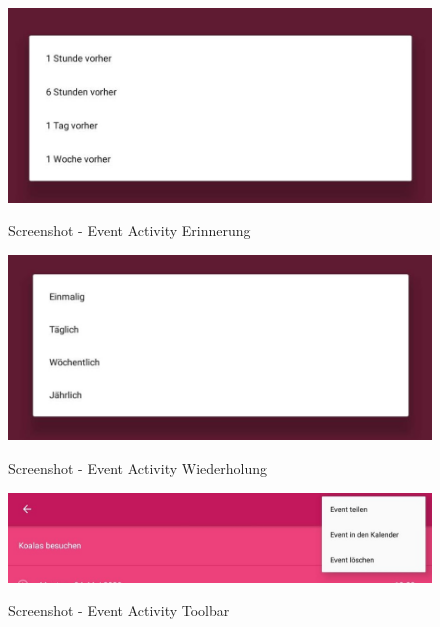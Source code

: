 \begin{figure}[H]
\centering
\begin{minipage}[t]{1\textwidth} %
\caption{Screenshot - Event Activity Erinnerung} %
\includegraphics[width=13 cm]{img/Screenshot_EventActivityReminder.jpg}\\ %
\end{minipage}
\end{figure}

\begin{figure}[H]
\centering
\begin{minipage}[t]{1\textwidth} %
\caption{Screenshot - Event Activity Wiederholung} %
\includegraphics[width=13 cm]{img/Screenshot_EventActivityRecurringType.jpg}\\ %
\end{minipage}
\end{figure}

\begin{figure}[H]
\centering
\begin{minipage}[t]{1\textwidth} %
\caption{Screenshot - Event Activity Toolbar} %
\includegraphics[width=13 cm]{img/Screenshot_EventActivityToolbar.jpg}\\ %
\end{minipage}
\end{figure}

